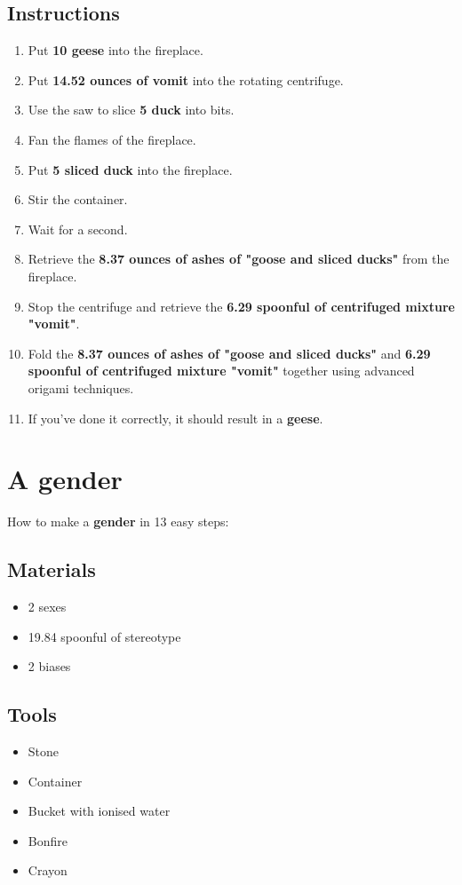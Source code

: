 \documentclass{article}
\begin{document}
\subsection{Instructions}\begin{enumerate}
\item 
Put \textbf{10 geese} into the fireplace.
\item 
Put \textbf{14.52 ounces of vomit} into the rotating centrifuge.
\item 
Use the saw to slice \textbf{5 duck} into bits.
\item 
Fan the flames of the fireplace.
\item 
Put \textbf{5 sliced duck} into the fireplace.
\item 
Stir the container.
\item 
Wait for a second.
\item 
Retrieve the \textbf{8.37 ounces of ashes of "goose and sliced ducks"} from the fireplace.
\item 
Stop the centrifuge and retrieve the \textbf{6.29 spoonful of centrifuged mixture "vomit"}.
\item 
Fold the \textbf{8.37 ounces of ashes of "goose and sliced ducks"} and \textbf{6.29 spoonful of centrifuged mixture "vomit"} together using advanced origami techniques.
\item 
If you've done it correctly, it should result in a \textbf{geese}.
\end{enumerate}
\newpage
\section{A gender}How to make a \textbf{gender} in 13 easy steps:

\subsection{Materials}\begin{itemize}
\item 
2 sexes
\item 
19.84 spoonful of stereotype
\item 
2 biases
\end{itemize}
\subsection{Tools}\begin{itemize}
\item 
Stone
\item 
Container
\item 
Bucket with ionised water
\item 
Bonfire
\item 
Crayon
\end{itemize}
\end{document}
